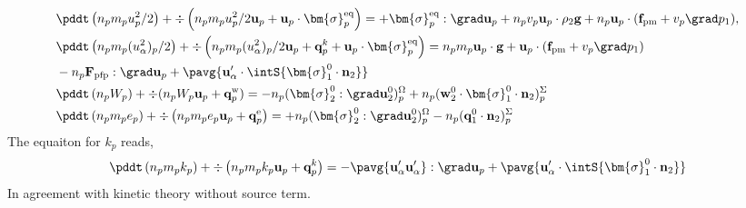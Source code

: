 \begin{align*}
    &\pddt \left(n_p m_p u_p^2/ 2\right)
    + \div \left(n_p
    m_p u_p^2/ 2 \textbf{u}_p 
    + \textbf{u}_p \cdot \bm{\sigma}_p^\text{eq}
    \right)
    = 
    + \bm{\sigma}_p^\text{eq}  :\grad \textbf{u}_p
    +  n_p v_p \textbf{u}_p \cdot 
    \rho_2 \textbf{g}
    + n_p \textbf{u}_p \cdot (\textbf{f}_\text{pm} + v_p \grad p_1),\\
    &\pddt \left(n_p m_p (u_\alpha^2)_p/ 2\right)
    + \div \left(n_p
    m_p (u_\alpha^2)_p/ 2 \textbf{u}_p 
    + \textbf{q}^k_p
    + \textbf{u}_p \cdot \bm{\sigma}_p^\text{eq}
    \right)
    = 
    n_p m_p \textbf{u}_p \cdot
    \textbf{g}
    + \textbf{u}_p\cdot(\textbf{f}_\text{pm} + v_p \grad p_1)\\
    &- n_p \textbf{F}_\text{pfp} : \grad \textbf{u}_p
    + \pavg{\textbf{u}_\alpha'\cdot\intS{\bm{\sigma}_1^0 \cdot \textbf{n}_2}}
    \\
    &\pddt \left(n_p W_p\right)
    + \div 
    (n_p W_p
    \textbf{u}_p 
    +  \textbf{q}_p^\text{w}
    )
    = 
    - n_p (\bm{\sigma}_2^0 : \grad\textbf{u}_2^0)^\Omega_p
    + n_p (\textbf{w}_2^0 \cdot \bm{\sigma}_1^0 \cdot  \textbf{n}_2)^\Sigma_p
    \\
    &\pddt \left(n_p m_p e_p\right)
    + \div \left(n_p
    m_p e_p \textbf{u}_p 
    +  \textbf{q}_p^\text{e}
    \right)
    = 
    + n_p (\bm{\sigma}_2^0 : \grad\textbf{u}_2^0)^\Omega_p
    - n_p (\textbf{q}_1^0\cdot \textbf{n}_2)^\Sigma_p\\
\end{align*}
The equaiton for $k_p$ reads, 
\begin{equation*}
    \pddt \left(n_p m_p k_p\right)
    + \div \left(n_p
    m_p k_p \textbf{u}_p 
    + \textbf{q}^k_p
    \right)
    = 
    - \pavg{\textbf{u}_\alpha'\textbf{u}_\alpha'} :\grad \textbf{u}_p
    + \pavg{\textbf{u}_\alpha'\cdot\intS{\bm{\sigma}_1^0 \cdot \textbf{n}_2}}
\end{equation*}
In agreement with kinetic theory without source term. 


